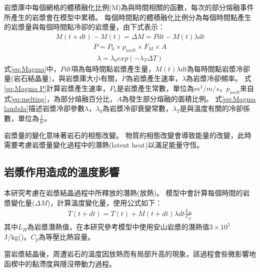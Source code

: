 岩漿庫中每個網格的體積融化比例(M)為與時間相關的函數，每次的部分熔融事件所產生的岩漿會在模型中累積。
每個時間點的體積融化比例分為每個時間點產生的岩漿量與每個時間點冷卻的岩漿量，由下式表示：
\begin{align}
    M(t+dt)-M(t) = \Delta M = Pdt-M(t)\lambda dt \label{eq:Magma}
\end{align}
\begin{align}
    P = P_0 \times p_{melt} \times F_M \times A \label{eq:Magma P}
\end{align}
\begin{align}
    \lambda = \lambda_0 exp(-\lambda_T\Delta T) \label{eq:Magma lambda}
\end{align}
式\ref{eq:Magma}中，$Pdt$項為每時間點岩漿產生量，$M(t)\lambda dt$為每時間點岩漿冷卻量(岩石結晶量)，與岩漿庫大小有關，$P$為岩漿產生速率，$\lambda$為岩漿冷卻頻率。
式\ref{eq:Magma P}計算岩漿產生速率，$P_0$是岩漿產生常數，單位為$m^3/m/s$，$p_{melt}$來自式\ref{eq:melting}，為部分熔融百分比，$A$為發生部分熔融的面積比例。
式\ref{eq:Magma lambda}描述岩漿冷卻參數$\lambda$，$\lambda_0$為岩漿冷卻衰變常數，$\lambda_T$是與溫度有關的冷卻係數，單位為$\frac{1}{K}$。

岩漿量的變化意味著岩石的相態改變。
物質的相態改變會導致能量的改變，此時需要考慮岩漿量變化過程中的潛熱(latent heat)以滿足能量守恆。
\subsection{岩漿作用造成的溫度影響}\label{岩漿作用造成的溫度影響}
本研究考慮在岩漿結晶過程中所釋放的潛熱(放熱)。
模型中會計算每個時間的岩漿變化量($\Delta M$)，計算溫度變化量，使用公式如下：
\begin{align}
    T(t+dt) = T(t) + M(t+dt)\lambda dt\frac{L_H}{C_p}\label{eq:latent heat}
\end{align}
其中$L_H$為岩漿潛熱值，在本研究參考模型中使用安山岩漿的潛熱值$3\times 10^5$ J/kg(\citealp{liu2011modeling})。$C_p$為等壓比熱容量。

當岩漿結晶後，周遭岩石的溫度因放熱而有局部升高的現象，該過程會些微影響地函楔中的黏滯度與隱沒帶動力過程。